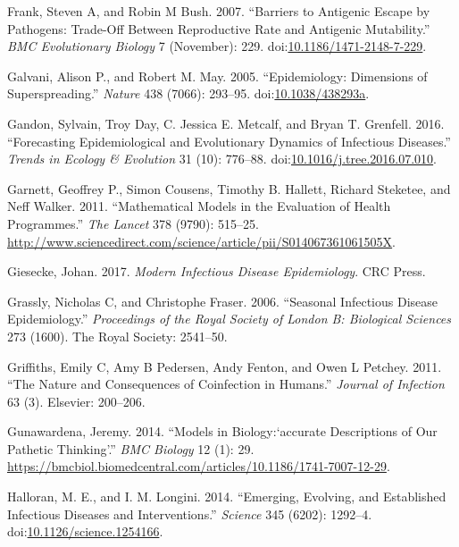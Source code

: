 \documentclass[]{book}
\theoremstyle{definition}
\theoremstyle{definition}
\theoremstyle{definition}
\theoremstyle{remark}
\begin{document}
\hypertarget{ref-frank07}{}
Frank, Steven A, and Robin M Bush. 2007. ``Barriers to Antigenic Escape
by Pathogens: Trade-Off Between Reproductive Rate and Antigenic
Mutability.'' \emph{BMC Evolutionary Biology} 7 (November): 229.
doi:\href{https://doi.org/10.1186/1471-2148-7-229}{10.1186/1471-2148-7-229}.

\hypertarget{ref-galvani05}{}
Galvani, Alison P., and Robert M. May. 2005. ``Epidemiology: Dimensions
of Superspreading.'' \emph{Nature} 438 (7066): 293--95.
doi:\href{https://doi.org/10.1038/438293a}{10.1038/438293a}.

\hypertarget{ref-gandon16}{}
Gandon, Sylvain, Troy Day, C. Jessica E. Metcalf, and Bryan T. Grenfell.
2016. ``Forecasting Epidemiological and Evolutionary Dynamics of
Infectious Diseases.'' \emph{Trends in Ecology \& Evolution} 31 (10):
776--88.
doi:\href{https://doi.org/10.1016/j.tree.2016.07.010}{10.1016/j.tree.2016.07.010}.

\hypertarget{ref-garnett11}{}
Garnett, Geoffrey P., Simon Cousens, Timothy B. Hallett, Richard
Steketee, and Neff Walker. 2011. ``Mathematical Models in the Evaluation
of Health Programmes.'' \emph{The Lancet} 378 (9790): 515--25.
\url{http://www.sciencedirect.com/science/article/pii/S014067361061505X}.

\hypertarget{ref-giesecke17}{}
Giesecke, Johan. 2017. \emph{Modern Infectious Disease Epidemiology}.
CRC Press.

\hypertarget{ref-grassly06}{}
Grassly, Nicholas C, and Christophe Fraser. 2006. ``Seasonal Infectious
Disease Epidemiology.'' \emph{Proceedings of the Royal Society of London
B: Biological Sciences} 273 (1600). The Royal Society: 2541--50.

\hypertarget{ref-griffiths11}{}
Griffiths, Emily C, Amy B Pedersen, Andy Fenton, and Owen L Petchey.
2011. ``The Nature and Consequences of Coinfection in Humans.''
\emph{Journal of Infection} 63 (3). Elsevier: 200--206.

\hypertarget{ref-gunawardena14}{}
Gunawardena, Jeremy. 2014. ``Models in Biology:`accurate Descriptions of
Our Pathetic Thinking'.'' \emph{BMC Biology} 12 (1): 29.
\url{https://bmcbiol.biomedcentral.com/articles/10.1186/1741-7007-12-29}.

\hypertarget{ref-halloran14}{}
Halloran, M. E., and I. M. Longini. 2014. ``Emerging, Evolving, and
Established Infectious Diseases and Interventions.'' \emph{Science} 345
(6202): 1292--4.
doi:\href{https://doi.org/10.1126/science.1254166}{10.1126/science.1254166}.
\end{document}
